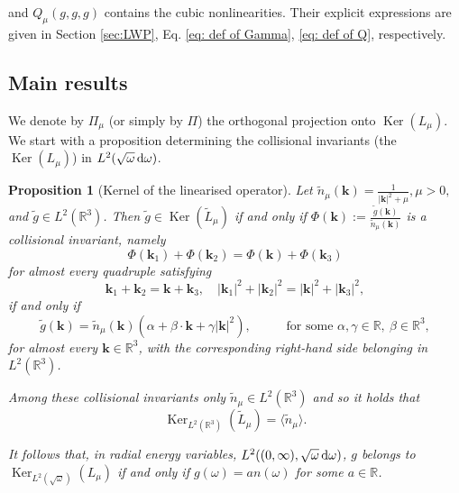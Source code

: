 \documentclass[reqno,11pt,letterpaper]{amsart}
\numberwithin{equation}{section}
\newcommand{\dd}{\, {\rm d}}
\newcommand{\RR}{{\mathbb R}}
\newtheorem{proposition}{Proposition}[section]
\begin{document}
 and $Q_\mu (g,g,g)$ contains the cubic nonlinearities.
Their explicit expressions are given in Section \ref{sec:LWP}, Eq. \eqref{eq: def of Gamma}, \eqref{eq: def of Q}, respectively. 


\subsection{Main results}
We denote by $\Pi_\mu$ (or simply by $\Pi$) the orthogonal projection onto $\operatorname{Ker}(L_\mu)$. We start with a proposition determining the collisional invariants (the $\operatorname{Ker}(L_\mu)$) in $L^2(\sqrt{\omega}\dd\omega)$. 
 
\begin{proposition}[Kernel of the linearised operator] \label{Prop:Kernel_L}
    Let $\widetilde n_\mu(\textbf{k})=\frac1{|\textbf{k}|^2+\mu}, \mu > 0,$ and $\tilde g \in L^2(\mathbb{R}^3)$. Then $\widetilde g \in \operatorname{Ker}(\widetilde L_\mu)$ if and only if $\Phi(\textbf{k}) := \frac{ \widetilde g(\textbf{k})}{\widetilde n_\mu (\textbf{k})}$ is a collisional invariant,
    namely
$$ \Phi(\textbf{k}_1)+\Phi(\textbf{k}_2) = \Phi(\textbf{k})+\Phi(\textbf{k}_3) $$ for almost every quadruple satisfying
$$
\textbf{k}_1+\textbf{k}_2 = \textbf{k}+\textbf{k}_3, \quad  |\textbf{k}_1|^2+|\textbf{k}_2|^2 =
    |\textbf{k}|^2+|\textbf{k}_3|^2, 
$$
if and only if  
    $$
    \widetilde g(\textbf{k})= \widetilde n_\mu(\textbf{k}) ( \alpha  + \beta \cdot \textbf{k} + \gamma |\textbf{k}|^2 ),\ \qquad \ \text{ for some } \alpha, \gamma \in \mathbb{R},\ \beta \in \mathbb{R}^3,$$ 
    for almost every $\textbf{k}\in \mathbb{R}^3$,  with the corresponding right-hand side belonging in $L^2(\mathbb{R}^3)$. 

    Among these collisional invariants only  $\widetilde n_\mu \in L^2(\mathbb{R}^3)$ and so it holds that $$\operatorname{Ker}_{L^2(\mathbb{R}^3)}( \widetilde L_\mu) = \langle \widetilde n_\mu \rangle.$$ 
    
    It follows that, in radial energy variables, $L^2((0,\infty), \sqrt{\omega} \dd\omega)$, $g$ belongs to $\operatorname{Ker}_{L^2(\sqrt{\omega})}( L_\mu)$ if and only if  $g(\omega )=a n(\omega )$ for some $a\in \RR$.
\end{proposition}
\end{document}
